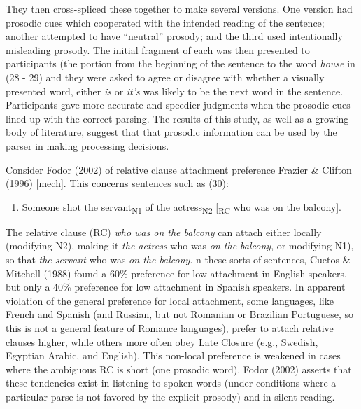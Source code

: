 \documentclass[12pt,oneside]{book}
\providecommand{\tightlist}{%
  \setlength{\itemsep}{0pt}\setlength{\parskip}{0pt}}
\begin{document}
They then cross-spliced these together to make several versions. One version had prosodic cues which cooperated with the intended reading of the sentence; another attempted to have ``neutral'' prosody; and the third used intentionally misleading prosody. The initial fragment of each was then presented to participants (the portion from the beginning of the sentence to the word \emph{house} in (28 - 29) and they were asked to agree or disagree with whether a visually presented word, either \emph{is} or \emph{it's} was likely to be the next word in the sentence. Participants gave more accurate and speedier judgments when the prosodic cues lined up with the correct parsing. The results of this study, as well as a growing body of literature, suggest that that prosodic information can  be used by the parser in making processing decisions.

Consider  Fodor (2002)  of relative clause attachment preference Frazier \& Clifton (1996)  \ref{mech}. This concerns sentences such as (30):

\begin{enumerate}
\def\labelenumi{(\arabic{enumi})}
\setcounter{enumi}{29}
\tightlist
\item
  Someone shot the servant\textsubscript{N1} of the actress\textsubscript{N2} {[}\textsubscript{RC} who was on the balcony{]}.
\end{enumerate}

The relative clause (RC) \emph{who was on the balcony} can attach either locally (modifying N2), making it \emph{the actress} who was \emph{on the balcony}, or modifying N1), so that  \emph{the servant}  who was \emph{on the balcony}. n these sorts of sentences, Cuetos \& Mitchell (1988) found a 60\% preference for low attachment in English speakers, but only a 40\% preference for low attachment in Spanish speakers. In apparent violation of the general preference for local attachment, some languages, like French and Spanish (and Russian, but not Romanian or Brazilian Portuguese, so this is not a general feature of Romance languages), prefer to attach relative clauses higher, while others more often obey Late Closure (e.g., Swedish, Egyptian Arabic, and English). This non-local preference is weakened in cases where the ambiguous RC is short (one prosodic word). Fodor (2002) asserts that these tendencies exist  in  listening to spoken words (under conditions where a particular parse is not favored by the explicit prosody) and in silent reading.
\end{document}
